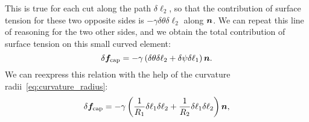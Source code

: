 This is true for each cut along the path $\delta \ell_2$, so that the contribution of surface tension for these two opposite sides is $ -\gamma \delta \theta \delta \ell_2$ along $\bn$. We can repeat this line of reasoning for the two other sides, and we obtain the total contribution of surface tension on this small curved element:
\begin{equation}
\delta \boldsymbol f_\text{cap} = - \gamma \lp \delta \theta \delta \ell_2 + \delta \psi \delta \ell_1 \rp \bn.
\end{equation}
We can reexpress this relation with the help of the curvature radii~\eqref{eq:curvature_radius}:
\begin{equation}
\delta \boldsymbol f_\text{cap} = - \gamma \lp \frac{1}{R_1}\delta \ell_1 \delta \ell_2 + \frac{1}{R_2}\delta \ell_1 \delta \ell_2 \rp \bn,
\end{equation}

